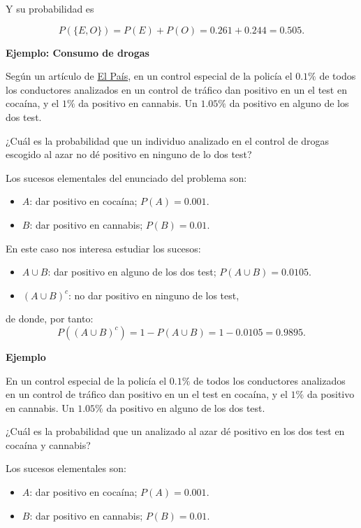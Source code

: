 \documentclass[
  letterpaper,
  DIV=11,
  numbers=noendperiod]{scrreprt}
\providecommand{\tightlist}{%
  \setlength{\itemsep}{0pt}\setlength{\parskip}{0pt}}\usepackage{longtable,booktabs,array}
\begin{document}
Y su probabilidad es

\[P(\{E,O\})=P(E)+P(O)=0.261+0.244=0.505.\]

\textbf{Ejemplo: Consumo de drogas}

Según un artículo de
\href{https://elpais.com/politica/2019/01/02/actualidad/1546426491_623324.html}{El
País}, en un control especial de la policía el \(0.1\%\) de todos los
conductores analizados en un control de tráfico dan positivo en un el
test en cocaína, y el \(1\%\) da positivo en cannabis. Un \(1.05\%\) da
positivo en alguno de los dos test.

¿Cuál es la probabilidad que un individuo analizado en el control de
drogas escogido al azar no dé positivo en ninguno de lo dos test?

Los sucesos elementales del enunciado del problema son:

\begin{itemize}
\tightlist
\item
  \(A\): dar positivo en cocaína; \(P(A)=0.001\).
\item
  \(B\): dar positivo en cannabis; \(P(B)=0.01\).
\end{itemize}

En este caso nos interesa estudiar los sucesos:

\begin{itemize}
\tightlist
\item
  \(A\cup B\): dar positivo en alguno de los dos test;
  \(P(A\cup B)=0.0105\).
\item
  \((A\cup B)^c\): no dar positivo en ninguno de los test,
\end{itemize}

de donde, por tanto: \[P((A\cup B)^c)=1-P(A\cup B)=1-0.0105=0.9895.\]

\textbf{Ejemplo}

En un control especial de la policía el \(0.1\%\) de todos los
conductores analizados en un control de tráfico dan positivo en un el
test en cocaína, y el \(1\%\) da positivo en cannabis. Un \(1.05\%\) da
positivo en alguno de los dos test.

¿Cuál es la probabilidad que un analizado al azar dé positivo en los dos
test en cocaína y cannabis?

Los sucesos elementales son:

\begin{itemize}
\tightlist
\item
  \(A\): dar positivo en cocaína; \(P(A)=0.001\).
\item
  \(B\): dar positivo en cannabis; \(P(B)=0.01\).
\end{itemize}
\end{document}
